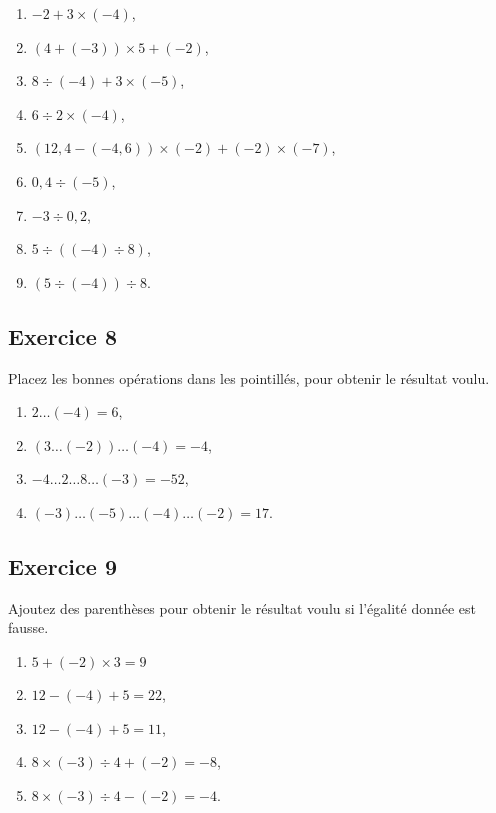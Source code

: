 \documentclass[12 pt]{extarticle}
\theoremstyle{plain}
\begin{document}
\begin{enumerate}
\item $-2 + 3 \times (-4)$, 
\item $ (4 + (-3)) \times 5 + (-2)$,
\item $ 8 \div(-4) + 3 \times (-5)$, 
\item $ 6 \div 2 \times (-4)$, 
\item $(12,4 - (-4,6)) \times (-2) + (-2) \times (-7) $, 
\item $ 0,4 \div (-5)$, 
\item $ - 3 \div 0,2$, 
\item $ 5 \div ((-4) \div 8)$,
\item $ (5 \div (-4) )\div 8$.


\end{enumerate}

\subsection*{Exercice 8}

Placez les bonnes opérations dans les pointillés, pour obtenir le résultat voulu. 

\begin{enumerate}
\item $2 \ldots (-4) = 6$, 
\item $(3 \ldots (-2) ) \ldots (-4) = -4$, 
\item $ -4 \ldots 2 \ldots 8 \ldots (-3) = -52$, 
\item $ (- 3) \ldots (- 5) \ldots (-4) \ldots (-2) = 17$.
\end{enumerate}

\subsection*{Exercice 9}

Ajoutez des parenthèses pour obtenir le résultat voulu si l'égalité donnée est fausse. 
\begin{enumerate}
\item $5 + (-2) \times 3 = 9$ 
\item $12 - (-4) + 5 = 22$, 
\item $12 - (-4) + 5 = 11$, 
\item $8 \times (-3) \div 4 + (-2) = - 8$,
\item $8 \times (-3) \div 4 - (-2) = -4 $. 
\end{enumerate}

 	
\end{document}
